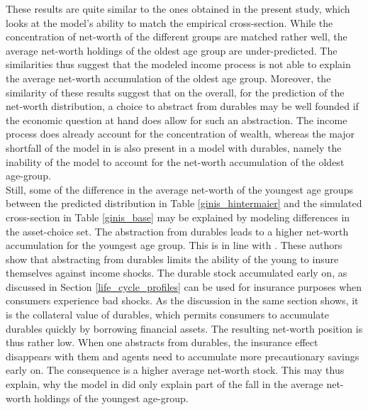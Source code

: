 \documentclass[a4paper,12pt,legno]{article}
\begin{document}
These results are quite similar to the ones obtained in the present study, which looks at the model's ability to match the empirical cross-section. While the concentration of net-worth of the different groups are matched rather well, the average net-worth holdings of the oldest age group are under-predicted. The similarities thus suggest that the modeled income process is not able to explain the average net-worth accumulation of the oldest age group. Moreover, the similarity of these results suggest that on the overall, for the prediction of the net-worth distribution, a choice to abstract from durables may be well founded if the economic question at hand does allow for such an abstraction. The income process does already account for the concentration of wealth, whereas the major shortfall of the model in \cite{hintermaier2011} is also present in a model with durables, namely the inability of the model to account for the net-worth accumulation of the oldest age-group.\\
Still, some of the difference in the average net-worth of the youngest age groups between the predicted distribution in Table \ref{ginis_hintermaier} and the simulated cross-section in Table \ref{ginis_base} may be explained by modeling differences in the asset-choice set. The abstraction from durables leads to a higher net-worth accumulation for the youngest age group. This is in line with \cite{FV&K2011}. These authors show that abstracting from durables limits the ability of the young to insure themselves against income shocks. The durable stock accumulated early on, as discussed in Section \ref{life_cycle_profiles} can be used for insurance purposes when consumers experience bad shocks. As the discussion in the same section shows, it is the collateral value of durables, which permits consumers to accumulate durables quickly by borrowing financial assets. The resulting net-worth position is thus rather low. When one abstracts from durables, the insurance effect disappears with them and agents need to accumulate more precautionary savings early on. The consequence is a higher average net-worth stock. This may thus explain, why the model in \cite{hintermaier2011} did only explain part of the fall in the average net-worth holdings of the youngest age-group. 
\end{document}
